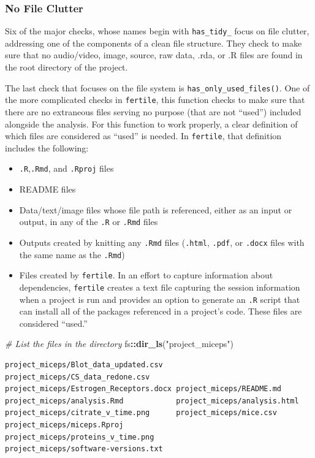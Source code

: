 \documentclass[12pt,twoside]{reedthesis}
\newenvironment{Shaded}{\begin{snugshade}}{\end{snugshade}}
\newcommand{\KeywordTok}[1]{\textcolor[rgb]{0.13,0.29,0.53}{\textbf{#1}}}
\newcommand{\StringTok}[1]{\textcolor[rgb]{0.31,0.60,0.02}{#1}}
\newcommand{\CommentTok}[1]{\textcolor[rgb]{0.56,0.35,0.01}{\textit{#1}}}
\newcommand{\OperatorTok}[1]{\textcolor[rgb]{0.81,0.36,0.00}{\textbf{#1}}}
\newcommand{\NormalTok}[1]{#1}
\providecommand{\tightlist}{%
  \setlength{\itemsep}{0pt}\setlength{\parskip}{0pt}}
\begin{document}
\subsubsection{No File Clutter}\label{no-file-clutter}

Six of the major checks, whose names begin with \texttt{has\_tidy\_}
focus on file clutter, addressing one of the components of a clean file
structure. They check to make sure that no audio/video, image, source,
raw data, .rda, or .R files are found in the root directory of the
project.

The last check that focuses on the file system is
\texttt{has\_only\_used\_files()}. One of the more complicated checks in
\texttt{fertile}, this function checks to make sure that there are no
extraneous files serving no purpose (that are not ``used'') included
alongside the analysis. For this function to work properly, a clear
definition of which files are considered as ``used'' is needed. In
\texttt{fertile}, that definition includes the following:
\begin{itemize}
\tightlist
\item
  \texttt{.R},\texttt{.Rmd}, and \texttt{.Rproj} files
\item
  README files
\item
  Data/text/image files whose file path is referenced, either as an
  input or output, in any of the \texttt{.R} or \texttt{.Rmd} files
\item
  Outputs created by knitting any \texttt{.Rmd} files (\texttt{.html},
  \texttt{.pdf}, or \texttt{.docx} files with the same name as the
  \texttt{.Rmd})
\item
  Files created by \texttt{fertile}. In an effort to capture information
  about dependencies, \texttt{fertile} creates a text file capturing the
  session information when a project is run and provides an option to
  generate an \texttt{.R} script that can install all of the packages
  referenced in a project's code. These files are considered ``used.''
\end{itemize}
\begin{Shaded}
\begin{Highlighting}[]
\CommentTok{# List the files in the directory}
\NormalTok{fs}\OperatorTok{::}\KeywordTok{dir_ls}\NormalTok{(}\StringTok{"project_miceps"}\NormalTok{)}
\end{Highlighting}
\end{Shaded}
\begin{verbatim}
project_miceps/Blot_data_updated.csv   project_miceps/CS_data_redone.csv      
project_miceps/Estrogen_Receptors.docx project_miceps/README.md               
project_miceps/analysis.Rmd            project_miceps/analysis.html           
project_miceps/citrate_v_time.png      project_miceps/mice.csv                
project_miceps/miceps.Rproj            project_miceps/proteins_v_time.png     
project_miceps/software-versions.txt   
\end{verbatim}
\end{document}
